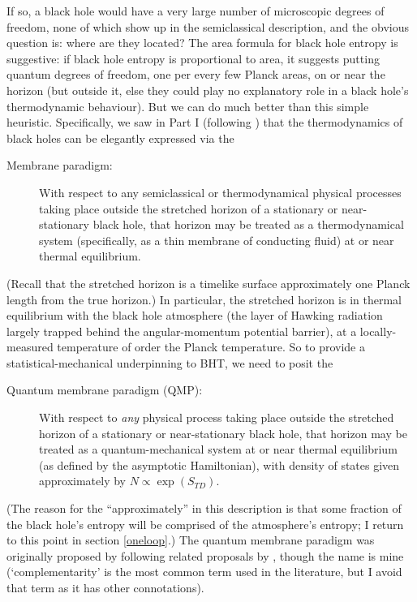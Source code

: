\documentclass{article}
\begin{document}
If so, a black hole would have a very large number of microscopic degrees of freedom, none of which show up in the semiclassical description, and the obvious question is: where are they located? The area formula for black hole entropy is suggestive: if black hole entropy is proportional to area, it suggests putting quantum degrees of freedom, one per every few Planck areas, on or near the horizon (but outside it, else they could play no explanatory role in a black hole's thermodynamic behaviour). But we can do much better than this simple heuristic. Specifically, we saw in Part I (following ) that 
the thermodynamics of black holes can be elegantly expressed via the
\begin{description}
\item[Membrane paradigm:] With respect to any semiclassical or thermodynamical physical processes taking place outside the stretched horizon of a stationary or near-stationary black hole, that horizon may be treated as a thermodynamical system (specifically, as a thin membrane of conducting fluid) at or near thermal equilibrium.
\end{description}
(Recall that the stretched horizon is a timelike surface approximately one Planck length from the true horizon.) In particular, the stretched horizon is in thermal equilibrium with the black hole atmosphere (the layer of Hawking radiation largely trapped behind the angular-momentum potential barrier), at a locally-measured temperature of order the Planck temperature. So to provide a statistical-mechanical underpinning to BHT, we need to posit the
\begin{description}
\item[Quantum membrane paradigm (QMP):] With respect to \emph{any} physical process taking place outside the stretched horizon of a stationary or near-stationary black hole, that horizon may be treated as a quantum-mechanical system at or near thermal equilibrium (as defined by the asymptotic Hamiltonian), with density of states given approximately by $N \propto \exp(S_{TD})$.
\end{description}
(The reason for the ``approximately'' in this description is that some fraction of the black hole's entropy will be comprised of the atmosphere's entropy; I return to this point in section \ref{oneloop}.) The quantum membrane paradigm was originally proposed by   following related proposals by , though the name is mine (`complementarity' is the most common term used in the literature, but I avoid that term as it has other connotations). 
\end{document}
